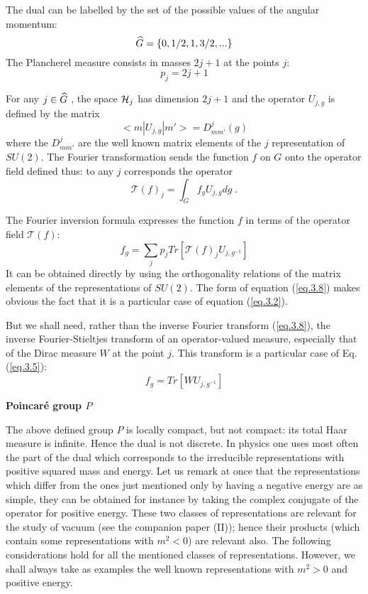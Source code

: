 \documentclass[a4paper,11pt]{article}
\begin{document}
The dual can be labelled by the set of the possible values of the angular momentum:
$$
  \widehat{G}  = \{0,1/2,1,3/2,...\}
$$
The Plancherel measure consists in masses $2j+1$ at the points $j$:
\begin{equation}
 \label{eq.3.6}
  p_j = 2j+1
\end{equation}

For any $j \in \widehat{G}$ , the space $\mathcal{H}_j$ has dimension $2j+1$ and the operator $U_{j,g}$ is 
defined by the matrix 
$$
    <m|U_{j,g}|m'> = D^j_{mm'}(g)
$$
where the $D^j_{mm'}$ are the well known matrix elements of the $j$ representation of $SU(2)$. 
The 
Fourier transformation sends the function $f$ on $G$ onto the operator field defined thus: to 
any $j$ corresponds the operator
\begin{equation}
 \label{eq.3.7}
  \mathcal{T}(f)_j = \int_G f_g U_{j,g} dg \;.
\end{equation}

The Fourier inversion formula expresses the function $f$ in terms of the operator field 
$\mathcal{T}(f)$:
\begin{equation}
 \label{eq.3.8}
   f_g = \sum_j p_j Tr[\mathcal{T}(f)_j U_{j,g^{-1}} ]
\end{equation}
It can be obtained directly by using the orthogonality relations of the matrix elements of the 
representations of $SU(2)$. The form of equation (\ref{eq.3.8}) makes obvious the fact that it 
is a particular case of equation (\ref{eq.3.2}). 

But we shall need, rather than the inverse Fourier transform (\ref{eq.3.8}), the inverse 
Fourier-Stieltjes transform of an operator-valued measure, especially that of the Dirac measure 
$W$ at the point $j$. This transform is a particular case of Eq. (\ref{eq.3.5}): 
\begin{equation}
 \label{eq.3.9}
  f_g = Tr[W U_{j,g^{-1}} ]
\end{equation}

{\bf Poincar\'e group $P$}

The above defined group $P$ is locally compact, but not compact: its total Haar measure is 
infinite. Hence the dual is not discrete. In physics one uses most often the part of the dual 
which corresponds to the irreducible representations with positive squared mass and energy. Let 
us remark at once that the representations which differ from the ones just mentioned only by 
having a negative energy are as simple, they can be obtained for instance by taking the complex 
conjugate of the operator for positive energy. These two classes of representations are 
relevant for the study of vacuum (see the companion paper (II)); hence their products (which 
contain some representations with $m^2<0$) are relevant also. The following considerations hold 
for all the mentioned classes of representations. However, we shall always take as examples the 
well known representations with $m^2>0$ and positive energy. 
\end{document}
